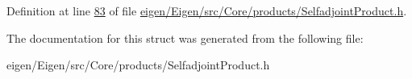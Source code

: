 Definition at line \hyperlink{eigen_2_eigen_2src_2_core_2products_2_selfadjoint_product_8h_source_l00083}{83} of file \hyperlink{eigen_2_eigen_2src_2_core_2products_2_selfadjoint_product_8h_source}{eigen/\+Eigen/src/\+Core/products/\+Selfadjoint\+Product.\+h}.



The documentation for this struct was generated from the following file\+:\begin{DoxyCompactItemize}
\item 
eigen/\+Eigen/src/\+Core/products/\+Selfadjoint\+Product.\+h\end{DoxyCompactItemize}
